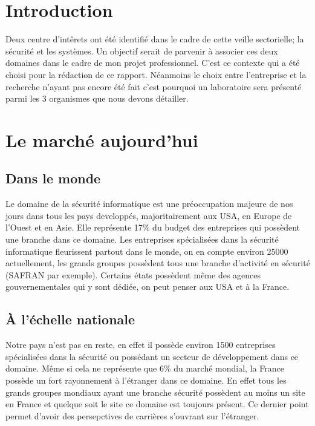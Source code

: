 \documentclass[a4paper,12pt]{article}
\begin{document}
\vfill


\tableofcontents
\vfill

\newpage
\section{Introduction}
Deux centre d'int\^erets ont été identifié dans le cadre de cette veille sectorielle; la sécurité et les systèmes. Un objectif serait de parvenir à associer ces deux domaines dans le cadre de mon projet professionnel. C'est ce contexte qui a été choisi pour la rédaction de ce rapport. Néanmoins le choix entre l'entreprise et la recherche n'ayant pas encore été fait c'est pourquoi un laboratoire sera présenté parmi les 3 organismes que nous devons détailler.

\section{Le marché aujourd'hui}
\subsection{Dans le monde}
Le domaine de la sécurité informatique est une préoccupation majeure de nos jours dans tous les pays developpés, majoritairement aux USA, en Europe de l'Ouest et en Asie. Elle représente 17\% du budget des entreprises qui possèdent une branche dans ce domaine. Les entreprises spécialisées dans la sécurité informatique fleurissent partout dans le monde, on en compte environ 25000 actuellement, les grands groupes possèdent tous une branche d'activité en sécurité (SAFRAN par exemple). Certains états possèdent m\^eme des agences gouvernementales qui y sont dédiée, on peut penser aux USA et à la France.

\subsection{À l'échelle nationale}

Notre pays n'est pas en reste, en effet il possède environ 1500 entreprises spécialisées dans la sécurité ou possédant un secteur de développement dans ce domaine. M\^eme si cela ne représente que 6\% du marché mondial, la France possède un fort rayonnement à l'étranger dans ce domaine. En effet tous les grands groupes mondiaux ayant une branche sécurité possèdent au moins un site en France et quelque soit le site ce domaine est toujours présent. Ce dernier point permet d'avoir des persepctives de carrières s'ouvrant sur l'étranger.
\newpage
\end{document}
